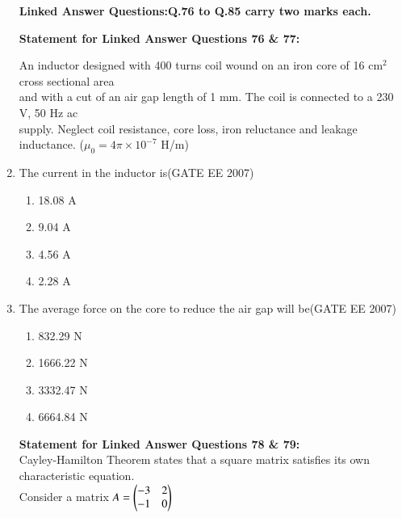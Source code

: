 \documentclass[a4paper,10pt]{exam}
\theoremstyle{remark}
\begin{document}
\begin{enumerate}
\vfill
{}
\newpage

{\textbf{Linked Answer Questions:Q.76 to Q.85 carry two marks each.}}
\vspace{0.5cm}

\raggedright{\textbf{Statement for Linked Answer Questions 76 \& 77:}}

\noindent

An inductor designed with 400 turns coil wound on an iron core of 16 cm$^2$ cross sectional area \\
and with a cut of an air gap length of 1 mm. The coil is connected to a 230 V, 50 Hz ac \\
supply. Neglect coil resistance, core loss, iron reluctance and leakage inductance. ($\mu_0 = 4\pi \times 10^{-7}$ H/m)

\vspace{1em}

\item  The current in the inductor is\hfill{(GATE EE 2007)}

\begin{multicols}{4}
\begin{enumerate}
    \item  18.08 A 
\item  9.04 A
\item  4.56 A 
\item 2.28 A 
\end{enumerate}
\end{multicols}

\item  The average force on the core to reduce the air gap will be\hfill{(GATE EE 2007)}

\begin{multicols}{4}
\begin{enumerate}
    \item  832.29 N 
\item  1666.22 N 
\item  3332.47 N 
\item  6664.84 N 
\end{enumerate}
\end{multicols}

\vspace{1em}

\noindent
\textbf{Statement for Linked Answer Questions 78 \& 79:} \\
Cayley-Hamilton Theorem states that a square matrix satisfies its own characteristic equation. \\
Consider a matrix
$
A =
\begin{pmatrix}
-3 & 2 \\
-1 & 0
\end{pmatrix}
$


\end{enumerate}
\end{document}
